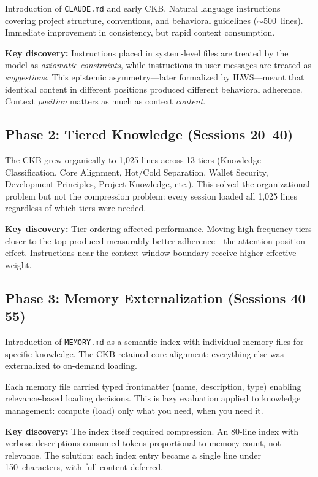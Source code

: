 \documentclass[11pt, a4paper]{article}
\begin{document}
Introduction of \texttt{CLAUDE.md} and early CKB. Natural language instructions covering project structure, conventions, and behavioral guidelines ($\sim$500~lines). Immediate improvement in consistency, but rapid context consumption.

\textbf{Key discovery:} Instructions placed in system-level files are treated by the model as \emph{axiomatic constraints}, while instructions in user messages are treated as \emph{suggestions}. This epistemic asymmetry---later formalized by ILWS---meant that identical content in different positions produced different behavioral adherence. Context \emph{position} matters as much as context \emph{content}.

\subsection{Phase 2: Tiered Knowledge (Sessions 20--40)}

The CKB grew organically to 1,025 lines across 13 tiers (Knowledge Classification, Core Alignment, Hot/Cold Separation, Wallet Security, Development Principles, Project Knowledge, etc.). This solved the organizational problem but not the compression problem: every session loaded all 1,025 lines regardless of which tiers were needed.

\textbf{Key discovery:} Tier ordering affected performance. Moving high-frequency tiers closer to the top produced measurably better adherence---the attention-position effect. Instructions near the context window boundary receive higher effective weight.

\subsection{Phase 3: Memory Externalization (Sessions 40--55)}

Introduction of \texttt{MEMORY.md} as a semantic index with individual memory files for specific knowledge. The CKB retained core alignment; everything else was externalized to on-demand loading.

Each memory file carried typed frontmatter (name, description, type) enabling relevance-based loading decisions. This is lazy evaluation applied to knowledge management: compute (load) only what you need, when you need it.

\textbf{Key discovery:} The index itself required compression. An 80-line index with verbose descriptions consumed tokens proportional to memory count, not relevance. The solution: each index entry became a single line under 150~characters, with full content deferred.
\end{document}
